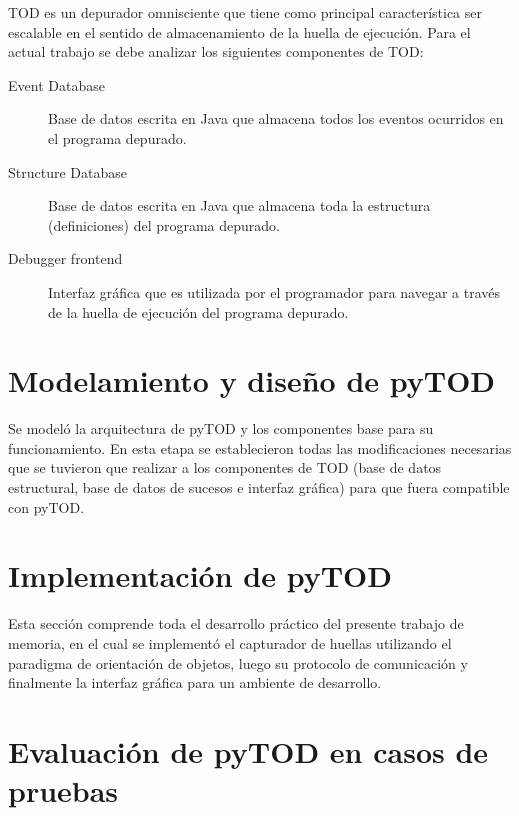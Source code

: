 \documentclass[12pt,legalpaper]{report}
\begin{document}
TOD es un depurador omnisciente que tiene como principal característica ser escalable en el sentido de almacenamiento de la huella de ejecución.  Para el actual trabajo se debe analizar los siguientes componentes de TOD:

\begin{description}
	\item[Event Database] Base de datos escrita en Java que almacena todos los eventos ocurridos en el programa depurado.
	\item[Structure Database] Base de datos escrita en Java que almacena toda la estructura (definiciones) del programa depurado.
	\item[Debugger frontend] Interfaz gráfica que es utilizada por el programador para navegar a través de la huella de ejecución del programa depurado.
\end{description}

	\section{Modelamiento y diseño de pyTOD}

    Se modeló la arquitectura de pyTOD y los componentes base para su funcionamiento.  En esta etapa se establecieron todas las modificaciones necesarias que se tuvieron que realizar a los componentes de TOD (base de datos estructural, base de datos de sucesos e interfaz gráfica) para que fuera compatible con pyTOD.

	\section{Implementación de pyTOD}

    Esta sección comprende toda el desarrollo práctico del presente trabajo de memoria, en el cual se implementó el capturador de huellas utilizando el paradigma de orientación de objetos, luego su protocolo de comunicación y finalmente la interfaz gráfica para un ambiente de desarrollo.
    

	\section{Evaluación de pyTOD en casos de pruebas}
\end{document}
